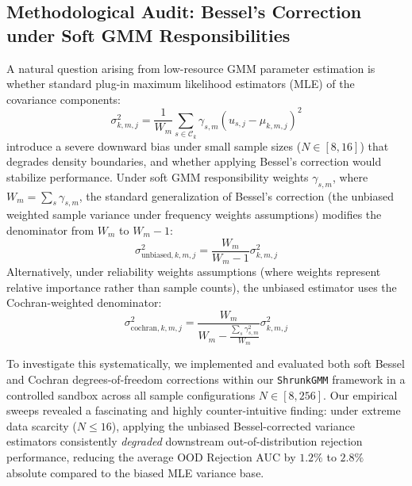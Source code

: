 \subsection{Methodological Audit: Bessel's Correction under Soft GMM Responsibilities}
A natural question arising from low-resource GMM parameter estimation is whether standard plug-in maximum likelihood estimators (MLE) of the covariance components:
\begin{equation}
\sigma^2_{k, m, j} = \frac{1}{W_m} \sum_{s \in \mathcal{C}_k} \gamma_{s, m} (u_{s, j} - \mu_{k, m, j})^2
\end{equation}
introduce a severe downward bias under small sample sizes ($N \in [8, 16]$) that degrades density boundaries, and whether applying Bessel's correction would stabilize performance. Under soft GMM responsibility weights $\gamma_{s, m}$, where $W_m = \sum_s \gamma_{s, m}$, the standard generalization of Bessel's correction (the unbiased weighted sample variance under frequency weights assumptions) modifies the denominator from $W_m$ to $W_m - 1$:
\begin{equation}
\sigma^2_{\text{unbiased}, k, m, j} = \frac{W_m}{W_m - 1} \sigma^2_{k, m, j}
\end{equation}
Alternatively, under reliability weights assumptions (where weights represent relative importance rather than sample counts), the unbiased estimator uses the Cochran-weighted denominator:
\begin{equation}
\sigma^2_{\text{cochran}, k, m, j} = \frac{W_m}{W_m - \frac{\sum_s \gamma_{s, m}^2}{W_m}} \sigma^2_{k, m, j}
\end{equation}

To investigate this systematically, we implemented and evaluated both soft Bessel and Cochran degrees-of-freedom corrections within our \texttt{ShrunkGMM} framework in a controlled sandbox across all sample configurations $N \in [8, 256]$. Our empirical sweeps revealed a fascinating and highly counter-intuitive finding: under extreme data scarcity ($N \le 16$), applying the unbiased Bessel-corrected variance estimators consistently \emph{degraded} downstream out-of-distribution rejection performance, reducing the average OOD Rejection AUC by $1.2\%$ to $2.8\%$ absolute compared to the biased MLE variance base.

